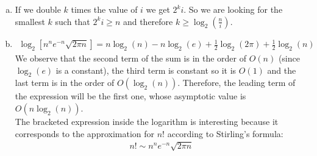 \documentclass{article}
\begin{document}
\begin{enumerate}[1.]
\begin{enumerate}[(a)]
        \item If we double $k$ times the value of $i$ we get $2^ki$. So we are looking for the smallest $k$ such that $2^ki \geq n$ and therefore $k \geq \log_2\left(\frac{n}{i}\right)$.
        \item 
        \begin{gather*}
            \log_2\left[n^ne^{-n}\sqrt{2\pi n}\right] = n\log_2(n) - n\log_2(e) + \frac{1}{2}\log_2(2\pi) + \frac{1}{2}\log_2(n)
        \end{gather*}
        We observe that the second term of the sum is in the order of $O(n)$ (since $\log_2(e)$ is a constant), the third term is constant so it is $O(1)$ and the last term is in the order of $O(\log_2(n))$. Therefore, the leading term of the expression will be the first one, whose asymptotic value is $O(n\log_2(n))$.\\
        The bracketed expression inside the logarithm is interesting because it corresponds to the approximation for $n!$ according to Stirling's formula:
        \begin{gather*}
            n! \sim n^ne^{-n}\sqrt{2\pi n}
        \end{gather*}
    \end{enumerate}

\end{enumerate}
\end{document}
